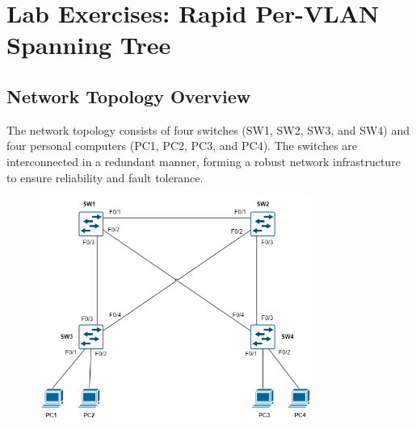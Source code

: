\documentclass[a4paper]{book}
\begin{document}
\newpage


\section*{Lab Exercises: Rapid Per-VLAN Spanning Tree}


\subsection*{Network Topology Overview}

The network topology consists of four switches (SW1, SW2, SW3, and SW4) and four personal computers (PC1, PC2, PC3, and PC4). The switches are interconnected in a redundant manner, forming a robust network infrastructure to ensure reliability and fault tolerance.
\begin{figure}[h]
	\centering
	\includegraphics[width=0.8\textwidth]{img/rstp.png}
	\caption{\textit{}}
\end{figure}
\end{document}
